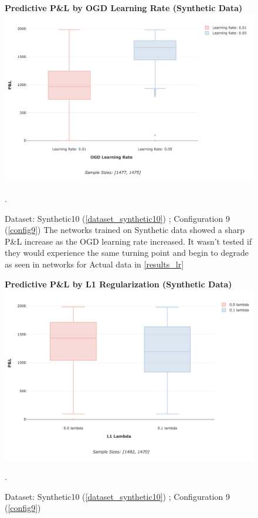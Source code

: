 \documentclass[a4paper,11pt,oneside]{article}
\theoremstyle{plain}
\theoremstyle{definition}
\begin{document}
\begin{figure}[H]
	\centering 
	\textbf{Predictive P\&L by OGD Learning Rate (Synthetic Data)}
	\includegraphics[scale=0.3]{images/results/network/lr/synth_ogd_lr.png} 
	\caption[Predictive P\&L by OGD Learning Rate (Synthetic Data)]{Dataset: Synthetic10 (\ref{dataset_synthetic10}) ;  Configuration 9 (\ref{config9}) 
		\newline The networks trained on Synthetic data showed a sharp P\&L increase as the OGD learning rate increased. It wasn't tested if they would experience the same turning point and begin to degrade as seen in networks for Actual data in \ref{results_lr}}.
	\label{figure-synth_ogd_lr}
\end{figure}

\begin{figure}[H]
	\centering 
	\textbf{Predictive P\&L by L1 Regularization (Synthetic Data)}
	\includegraphics[scale=0.3]{images/results/network/reg/synth_pl_reg.png} 
	\caption[Predictive P\&L by L1 Regularization (Synthetic Data)]{Dataset: Synthetic10 (\ref{dataset_synthetic10}) ; Configuration 9 (\ref{config9})  
		\newline }.
	\label{figure-synth_pl_reg}
\end{figure}
\end{document}
